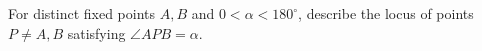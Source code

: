 For distinct fixed points $A,B$ and $0<\alpha<180^\circ$, describe the locus of points $P\ne A,B$ satisfying $\angle APB=\alpha$.
